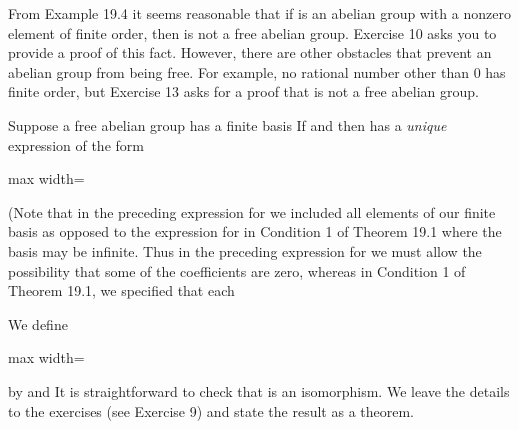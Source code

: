 \documentclass[11pt,oneside]{article}
\begin{document}
\begin{BookBody}
From Example 19.4 it seems reasonable that if  is an abelian group with a nonzero element of finite order, then  is not a free abelian group. Exercise 10 asks you to provide a proof of this fact. However, there are other obstacles that prevent an abelian group from being free. For example, no rational number other than 0 has finite order, but Exercise 13 asks for a proof that  is not a free abelian group.

Suppose a free abelian group  has a finite basis  If  and  then  has a\textit{ unique} expression of the form

\begin{center}\begin{adjustbox}{max width=\linewidth}\end{adjustbox}\end{center}

\noindent (Note that in the preceding expression for  we included all elements  of our finite basis  as opposed to the expression for  in Condition 1 of Theorem 19.1 where the basis may be infinite. Thus in the preceding expression for  we must allow the possibility that some of the coefficients  are zero, whereas in Condition 1 of Theorem 19.1, we specified that each 

\noindent We define

\begin{center}\begin{adjustbox}{max width=\linewidth}\end{adjustbox}\end{center}

\noindent by  and  It is straightforward to check that \BookInline{\phi } is an isomorphism. We leave the details to the exercises (see Exercise 9) and state the result as a theorem.


\end{BookBody}
\end{document}
